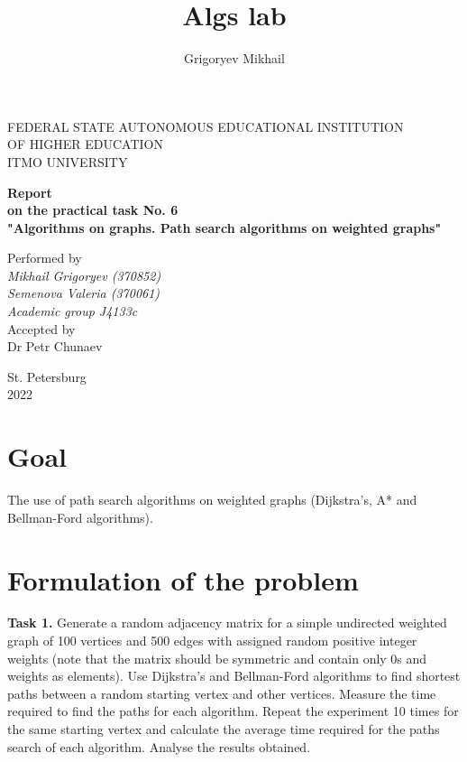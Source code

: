 \documentclass[12pt, a4paper]{article}
\author{Grigoryev Mikhail}
\title{Algs lab}
\begin{document}
\thispagestyle{empty}

\vspace{30mm}

\begin{center}
FEDERAL STATE AUTONOMOUS EDUCATIONAL INSTITUTION \\
OF HIGHER EDUCATION \\
ITMO UNIVERSITY

\vspace{40mm}

{\large \textbf{Report \\
on the practical task No. 6 \\
"Algorithms on graphs. Path search algorithms on weighted graphs"}}
\end{center}

\vspace{15mm}

\begin{flushright}
{\large Performed by \\
\textit{Mikhail Grigoryev (370852) \\
Semenova Valeria (370061) \\
Academic group J4133c \\}
Accepted by \\
Dr Petr Chunaev}
\end{flushright}

\vspace{80mm}

\begin{center}
St. Petersburg \\
2022
\end{center}

\newpage

\section*{Goal}

The use of path search algorithms on weighted graphs (Dijkstra's, A* and Bellman-Ford algorithms).

\section*{Formulation of the problem}

\textbf{Task 1.} Generate a random adjacency matrix for a simple undirected weighted graph of 100 vertices and 500 edges with assigned random positive integer weights (note that the matrix should be symmetric and contain only 0s and weights as elements). Use Dijkstra's and Bellman-Ford algorithms to find shortest paths between a random starting vertex and other vertices. Measure the time required to find the paths for each algorithm. Repeat the experiment 10 times for the same starting vertex and calculate the average time required for the paths search of each algorithm. Analyse the results obtained.
\end{document}
